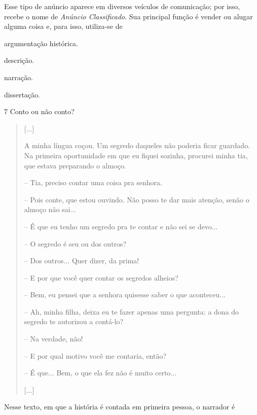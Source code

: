 Esse tipo de anúncio aparece em diversos veículos de comunicação; por
isso, recebe o nome de \emph{Anúncio Classificado}. Sua principal função
é vender ou alugar alguma coisa e, para isso, utiliza-se de

\begin{escolha}
\item argumentação histórica.

\item descrição.

\item narração.

\item dissertação.
\end{escolha}


\num{7} Conto ou não conto?

\begin{quote}
{[}...{]}

A minha língua coçou. Um segredo daqueles não poderia ficar guardado. Na
primeira oportunidade em que eu fiquei sozinha, procurei minha tia, que
estava preparando o almoço.

-- Tia, preciso contar uma coisa pra senhora.

-- Pois conte, que estou ouvindo. Não posso te dar mais atenção, senão o
almoço não sai...

-- É que eu tenho um segredo pra te contar e não sei se devo...

-- O segredo é seu ou dos outros?

-- Dos outros... Quer dizer, da prima!

-- E por que você quer contar os segredos alheios?

-- Bem, eu pensei que a senhora quisesse saber o que aconteceu...

-- Ah, minha filha, deixa eu te fazer apenas uma pergunta: a dona do
segredo te autorizou a contá-lo?

-- Na verdade, não!

-- E por qual motivo você me contaria, então?

-- É que... Bem, o que ela fez não é muito certo...

{[}...{]}

\end{quote}

Nesse texto, em que a história é contada em primeira pessoa, o narrador
é

